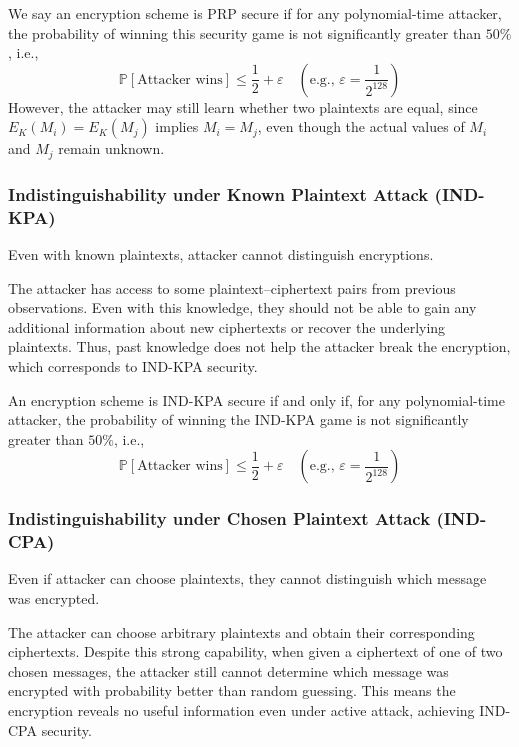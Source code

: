 We say an encryption scheme is PRP secure if for any polynomial-time attacker, the probability of winning this security game is not significantly greater than \(50\%\), i.e.,
\[
  \mathbb{P}[\text{Attacker wins}] \leq \frac{1}{2} + \varepsilon \quad (\text{e.g., } \varepsilon = \frac{1}{2^{128}})
\]
However, the attacker may still learn whether two plaintexts are equal, since \(E_K(M_i) = E_K(M_j)\) implies \(M_i = M_j\), even though the actual values of \(M_i\) and \(M_j\) remain unknown.

\subsubsection{Indistinguishability under Known Plaintext Attack (IND-KPA)}
Even with known plaintexts, attacker cannot distinguish encryptions.

\begin{intuition}
  The attacker has access to some plaintext--ciphertext pairs from previous observations. Even with this knowledge, they should not be able to gain any additional information about new ciphertexts or recover the underlying plaintexts. Thus, past knowledge does not help the attacker break the encryption, which corresponds to IND-KPA security.
\end{intuition}

An encryption scheme is IND-KPA secure if and only if, for any polynomial-time attacker, the probability of winning the IND-KPA game is not significantly greater than \(50\%\), i.e.,
\[
  \mathbb{P}[\text{Attacker wins}] \leq \frac{1}{2} + \varepsilon \quad (\text{e.g., } \varepsilon = \frac{1}{2^{128}})
\]

\subsubsection{Indistinguishability under Chosen Plaintext Attack (IND-CPA)}
Even if attacker can choose plaintexts, they cannot distinguish which message was encrypted.

\begin{intuition}
  The attacker can choose arbitrary plaintexts and obtain their corresponding ciphertexts. Despite this strong capability, when given a ciphertext of one of two chosen messages, the attacker still cannot determine which message was encrypted with probability better than random guessing. This means the encryption reveals no useful information even under active attack, achieving IND-CPA security.
\end{intuition}

